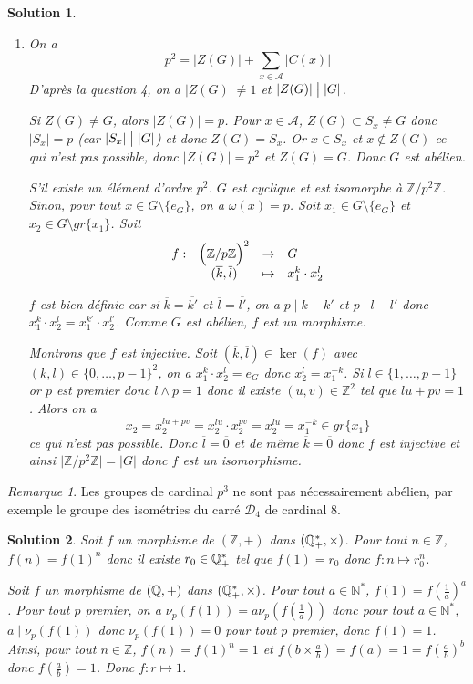 \documentclass[12pt]{article}
\newtheorem{solution}{Solution}[section]
\theoremstyle{remark}
\newtheorem{remark}{Remarque}[section]
\newcommand{\N}{\mathbb{N}} \newcommand{\Z}{\mathbb{Z}}
\newcommand{\function}[5]{
	$$
	\begin{array}{rccl}
		#1: & #2 & \to & #3 \\
		& #4 & \mapsto & #5
	\end{array}
	$$
}
\numberwithin{equation}{section}
\begin{document}
\begin{solution}
\begin{enumerate}
		\item On a 
		$$p^{2}=\vert Z(G)\vert+\sum_{x\in\mathcal{A}}\vert C(x)\vert$$
		D'après la question 4, on a $\vert Z(G)\vert\neq1$ et $\vert Z(G)\vert\bigm|\vert G\vert$.

		Si $Z(G)\neq G$, alors $\vert Z(G)\vert=p$. Pour $x\in\mathcal{A}$, $Z(G)\subset S_{x}\neq G$ donc $\vert S_{x}\vert= p$ (car $\vert S_{x}\vert\bigm|\vert G\vert$) et donc $Z(G)=S_{x}$. Or $x\in S_{x}$ et $x\notin Z(G)$ ce qui n'est pas possible, donc $\vert Z(G)\vert=p^{2}$ et $Z(G)=G$. Donc $G$ est abélien.

		S'il existe un élément d'ordre $p^{2}$. $G$ est cyclique et est isomorphe à $\Z/p^{2}\Z$. Sinon, pour tout $x\in G\setminus\{e_{G}\}$, on a $\omega(x)=p$. Soit $x_{1}\in G\setminus\{e_{G}\}$ et $x_{2}\in G\setminus gr\{x_{1}\}$.
		Soit \function{f}{\Bigl(\Z/p\Z\Bigr)^{2}}{G}{(\overline{k},\overline{l})}{x_{1}^{k}\cdot x_{2}^{l}}
		$f$ est bien définie car si $\overline{k}=\overline{k'}$ et $\overline{l}=\overline{l'}$, on a $p\mid k-k'$ et $p\mid l-l'$ donc $x_{1}^{k}\cdot x_{2}^{l}=x_{1}^{k'}\cdot x_{2}^{l'}$. Comme $G$ est abélien, $f$ est un morphisme. 
		
		Montrons que $f$ est injective. Soit $(\overline{k},\overline{l})\in\ker(f)$ avec $(k,l)\in\{0,\dots,p-1\}^{2}$, on a $x_{1}^{k}\cdot x_{2}^{l}=e_{G}$ donc $x_{2}^{l}=x_{1}^{-k}$. Si $l\in\{1,\dots,p-1\}$ or $p$ est premier donc $l\wedge p=1$ donc il existe $(u,v)\in\Z^{2}$ tel que $lu+pv=1$. Alors on a 
		$$x_{2}=x_{2}^{lu+pv}=x_{2}^{lu}\cdot x_{2}^{pv}=x_{2}^{lu}=x_{1}^{-k}\in gr\{x_{1}\}$$ ce qui n'est pas possible. Donc $\overline{l}=\overline{0}$ et de même $\overline{k}=\overline{0}$ donc $f$ est injective et ainsi 
		$\vert\Z/p^{2}\Z\vert=\vert G\vert$ donc $f$ est un isomorphisme.
	\end{enumerate}
\end{solution}

\begin{remark}
	Les groupes de cardinal $p^{3}$ ne sont pas nécessairement abélien, par exemple le groupe des isométries du carré $\mathcal{D}_{4}$ de cardinal 8.
\end{remark}

\begin{solution}
	Soit $f$ un morphisme de $(\Z,+)$ dans $(\mathbb{Q}_{+}^{*},\times)$. Pour tout $n\in\Z$, $f(n)=f(1)^{n}$ donc il existe $r_{0}\in\mathbb{Q}_{+}^{*}$ tel que $f(1)=r_{0}$ donc $f\colon n\mapsto r_{0}^{n}$.

	Soit $f$ un morphisme de $(\mathbb{Q},+)$ dans $(\mathbb{Q}_{+}^{*},\times)$. Pour tout $a\in\N^{*}$, $f(1)=f(\frac{1}{a})^{a}$. Pour tout $p$ premier, on a $\nu_{p}(f(1))=a\nu_{p}(f(\frac{1}{a}))$ donc pour tout $a\in\N^{*}$, $a\mid\nu_{p}(f(1))$ donc $\nu_{p}(f(1))=0$ pour tout $p$ premier, donc $f(1)=1$. Ainsi, pour tout $n\in\Z$, $f(n)=f(1)^{n}=1$ et $f(b\times\frac{a}{b})=f(a)=1=f(\frac{a}{b})^{b}$ donc $f(\frac{a}{b})=1$. Donc $f\colon r\mapsto 1$.
\end{solution}
\end{document}
